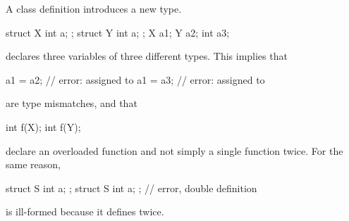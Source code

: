 \pnum
A class definition introduces a new type.
\begin{example}

\begin{codeblock}
struct X { int a; };
struct Y { int a; };
X a1;
Y a2;
int a3;
\end{codeblock}

declares three variables of three different types. This implies that

\begin{codeblock}
a1 = a2;                        // error:  assigned to 
a1 = a3;                        // error:  assigned to 
\end{codeblock}

are type mismatches, and that

\begin{codeblock}
int f(X);
int f(Y);
\end{codeblock}

%
declare an overloaded function  and not
simply a single function  twice. For the same reason,

\begin{codeblock}
struct S { int a; };
struct S { int a; };            // error, double definition
\end{codeblock}

is ill-formed because it defines  twice.
\end{example}

